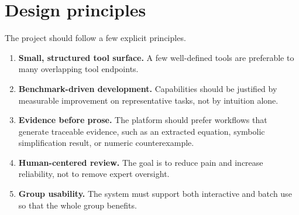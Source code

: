 \section{Design principles}

The project should follow a few explicit principles.

\begin{enumerate}[label=\arabic*.]
  \item \textbf{Small, structured tool surface.} A few well-defined tools are preferable to many overlapping tool endpoints.
  \item \textbf{Benchmark-driven development.} Capabilities should be justified by measurable improvement on representative tasks, not by intuition alone.
  \item \textbf{Evidence before prose.} The platform should prefer workflows that generate traceable evidence, such as an extracted equation, symbolic simplification result, or numeric counterexample.
  \item \textbf{Human-centered review.} The goal is to reduce pain and increase reliability, not to remove expert oversight.
  \item \textbf{Group usability.} The system must support both interactive and batch use so that the whole group benefits.
\end{enumerate}
